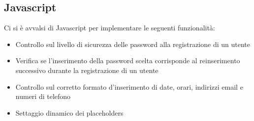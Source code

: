 \pagebreak

\subsection{Javascript}
Ci si è avvalsi di Javascript per implementare le seguenti funzionalità:
\begin{itemize}
\item Controllo sul livello di sicurezza delle password alla registrazione di un utente
\item Verifica se l'inserimento della password scelta corrisponde al reinserimento successivo durante la registrazione di un utente
\item Controllo sul corretto formato d'inserimento di date, orari, indirizzi email e numeri di telefono
\item Settaggio dinamico dei placeholders
\end{itemize}